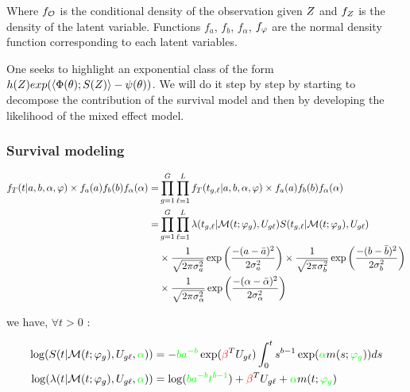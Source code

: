 \documentclass[a4paper]{article}
\begin{document}
\begin{myAppendix}
Where $f_\mathcal O$ is the conditional density of the observation given $Z$ and $f_{Z}$ is the density of the latent variable. Functions $f_a$, $f_b$, $f_\alpha$, $f_\varphi$ are the normal density function corresponding to each latent variables.


One seeks to highlight an exponential class of the form $h(Z)exp(\left\langle\Phi(\theta); S(Z)\right\rangle -\psi(\theta))$. We will do it step by step by starting to decompose the contribution of the survival model and then by developing the likelihood of the mixed effect model.


\subsubsection*{Survival modeling}
    
    \begin{align*}
        f_T(t | a,b,\alpha,\vphi) \times \df a \df b \df \alpha
        =& \pro \geno 1 \maxgeno \pro \lines 1 \maxlines f_T(t_\genolines | a,b,\alpha,\vphi) \times \df a \df b \df \alpha
        \\
        =& \pro \geno 1 \maxgeno \pro \lines 1 \maxlines \lambda(t_\genolines | \mc M( t ; \vphi_\geno),U_\meltgenolines) S(t_\genolines|\mc M( t ; \vphi_\geno),U_\meltgenolines) 
        \\ &\times \dnorm{\bar a}{\sigma_a^2}{a} \times \dnorm{\bar b}{\sigma_b^2}{b}
        \\ &\times  \dnorm{\bar \alpha}{\sigma_\alpha^2}{\alpha}
    \end{align*}
    
    we have, $\forall t > 0$ :
    
    \begin{align*}
        \log(S(t|\mathcal M( t ; \varphi_g), U_{g\ell}, \textcolor{green}{\alpha}))  &= -\textcolor{green}{b a^{-b}} \exp(\textcolor{red}{\beta}^T U_{g\ell}) \int_0^t s^{b-1} \exp(\textcolor{green}{\alpha} m(s; \textcolor{green}{\varphi_g})) ds
        \\ \log(\lambda(t | \mathcal M(t ; \varphi_g), U_{g\ell}, \textcolor{green}{\alpha})) &= \log(\textcolor{green}{b a^{-b} t^{b-1}}) + \textcolor{red}{\beta}^T U_{g\ell} + \textcolor{green}{\alpha}m(t ; \textcolor{green}{\varphi_g})
    \end{align*}


\end{myAppendix}
\end{document}
